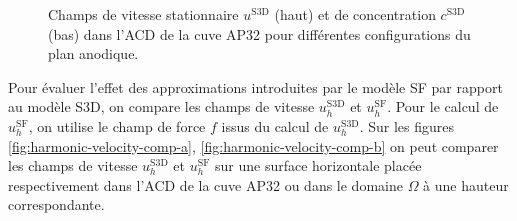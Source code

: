 \begin{figure}[!h]
\begin{center}
    \caption{Champs de vitesse stationnaire $u^{\mathrm{S3D}}$ (haut) et de
      concentration $c^\mathrm{S3D}$ (bas) dans l'ACD de la cuve
      AP32 pour différentes configurations du plan anodique.}
    \label{fig:f3d-deactivated-b}
  \end{center}
\end{figure}

Pour évaluer l'effet des approximations introduites par le modèle
SF par rapport au modèle S3D, on compare les champs de vitesse
$u_h^{\mathrm{S3D}}$ et $u_h^{\mathrm{SF}}$. Pour le calcul de
$u_h^{\mathrm{SF}}$, on utilise le champ de force $f$ issus du calcul de
$u_h^{\mathrm{S3D}}$. Sur les figures \ref{fig:harmonic-velocity-comp-a}, \ref{fig:harmonic-velocity-comp-b}
on peut comparer les champs de vitesse $u_h^{\mathrm{S3D}}$ et
$u_h^\mathrm{SF}$ sur une surface horizontale placée respectivement
dans l'ACD de la cuve AP32 ou dans le domaine $\Omega$ à une hauteur
correspondante.

